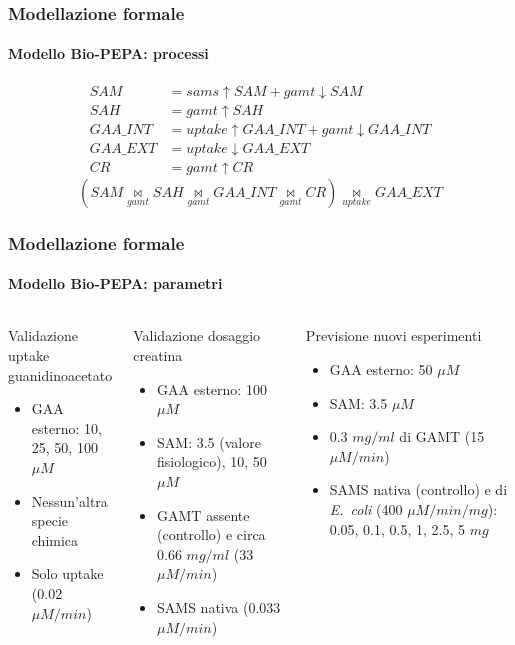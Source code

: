 \fi

\begin {frame}
\frametitle {Modellazione formale}
\framesubtitle{Modello Bio-PEPA: processi}
\begin{align*}
SAM &= sams \uparrow SAM + gamt \downarrow SAM\\
SAH &= gamt \uparrow SAH\\
GAA\_INT &= uptake \uparrow GAA\_INT + gamt \downarrow GAA\_INT\\
GAA\_EXT &= uptake \downarrow GAA\_EXT\\
CR &= gamt \uparrow CR
\end{align*}
\begin{equation*}
	(SAM \underset{gamt}{\bowtie} SAH \underset{gamt}{\bowtie} GAA\_INT \underset{gamt}{\bowtie} CR)\underset{uptake}{\bowtie} GAA\_EXT
\end{equation*}
\end{frame}

\begin {frame}
\frametitle {Modellazione formale}
\framesubtitle{Modello Bio-PEPA: parametri}
{
\begin{columns}[t]
	\begin{block}
	{Validazione uptake guanidinoacetato}
	\begin{itemize}
		\item GAA esterno: 10, 25, 50, 100 $\mu M$
		\item Nessun'altra specie chimica
		\item Solo uptake (0.02 $\mu M / min$)
	\end{itemize}
	\end{block}
	\column{.3\textwidth}
	\begin{block}{Validazione dosaggio creatina}
		\begin{itemize}
			\item GAA esterno: 100 $\mu M$
			\item SAM: 3.5 (valore fisiologico), 10, 50 $\mu M$
			\item GAMT assente (controllo) e circa 0.66 $mg/ml$ (33 $\mu M/min$)
			\item SAMS nativa (0.033 $\mu M / min$)
		\end{itemize}
	\end{block}
	\begin{block}{Previsione nuovi esperimenti}
		\begin{itemize}
			\item GAA esterno: 50 $\mu M$
			\item SAM: 3.5 $\mu M$
			\item 0.3 $mg/ml $ di GAMT  (15 $\mu M/min$)
			\item SAMS nativa (controllo) e di \emph{E.\ coli} (400 $\mu M/min/mg$):  0.05, 0.1, 0.5, 1, 2.5, 5 $mg$
		\end{itemize}
	\end{block}
\end{columns}
}
\end{frame}


